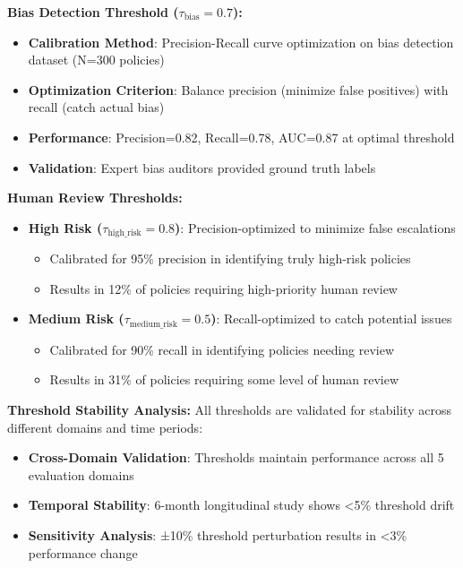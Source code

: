 \documentclass[sigconf,natbib]{acmart}
\begin{document}
\textbf{Bias Detection Threshold ($\tau_{\text{bias}} = 0.7$):}
\begin{itemize}
    \item \textbf{Calibration Method}: Precision-Recall curve optimization on bias detection dataset (N=300 policies)
    \item \textbf{Optimization Criterion}: Balance precision (minimize false positives) with recall (catch actual bias)
    \item \textbf{Performance}: Precision=0.82, Recall=0.78, AUC=0.87 at optimal threshold
    \item \textbf{Validation}: Expert bias auditors provided ground truth labels
\end{itemize}

\textbf{Human Review Thresholds:}
\begin{itemize}
    \item \textbf{High Risk ($\tau_{\text{high\_risk}} = 0.8$)}: Precision-optimized to minimize false escalations
    \begin{itemize}
        \item Calibrated for 95\% precision in identifying truly high-risk policies
        \item Results in 12\% of policies requiring high-priority human review
    \end{itemize}
    \item \textbf{Medium Risk ($\tau_{\text{medium\_risk}} = 0.5$)}: Recall-optimized to catch potential issues
    \begin{itemize}
        \item Calibrated for 90\% recall in identifying policies needing review
        \item Results in 31\% of policies requiring some level of human review
    \end{itemize}
\end{itemize}

\textbf{Threshold Stability Analysis:}
All thresholds are validated for stability across different domains and time periods:
\begin{itemize}
    \item \textbf{Cross-Domain Validation}: Thresholds maintain performance across all 5 evaluation domains
    \item \textbf{Temporal Stability}: 6-month longitudinal study shows <5\% threshold drift
    \item \textbf{Sensitivity Analysis}: ±10\% threshold perturbation results in <3\% performance change
\end{itemize}
\end{document}
